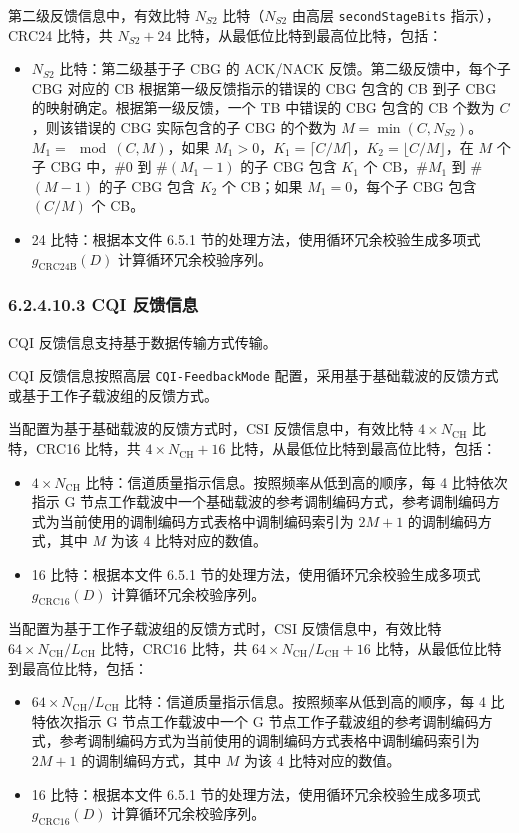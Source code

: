 \documentclass[11pt,a4paper]{ctexart}
\begin{document}
第二级反馈信息中，有效比特 $N_{S2}$ 比特（$N_{S2}$ 由高层 \texttt{secondStageBits} 指示），CRC24 比特，共 $N_{S2} + 24$ 比特，从最低位比特到最高位比特，包括：
\begin{itemize}[nosep]
  \item $N_{S2}$ 比特：第二级基于子 CBG 的 ACK/NACK 反馈。第二级反馈中，每个子 CBG 对应的 CB 根据第一级反馈指示的错误的 CBG 包含的 CB 到子 CBG 的映射确定。根据第一级反馈，一个 TB 中错误的 CBG 包含的 CB 个数为 $C$，则该错误的 CBG 实际包含的子 CBG 的个数为 $M = \min(C, N_{S2})$。$M_1 = \mod(C, M)$，如果 $M_1 > 0$，$K_1 = \lceil C/M \rceil$，$K_2 = \lfloor C/M \rfloor$，在 $M$ 个子 CBG 中，\#0 到 \#$(M_1-1)$ 的子 CBG 包含 $K_1$ 个 CB，\#$M_1$ 到 \#$(M-1)$ 的子 CBG 包含 $K_2$ 个 CB；如果 $M_1 = 0$，每个子 CBG 包含 $(C/M)$ 个 CB。
  \item 24 比特：根据本文件 6.5.1 节的处理方法，使用循环冗余校验生成多项式 $g_{\mathrm{CRC24B}}(D)$ 计算循环冗余校验序列。
\end{itemize}

\subsubsection{6.2.4.10.3 CQI 反馈信息}

CQI 反馈信息支持基于数据传输方式传输。

CQI 反馈信息按照高层 \texttt{CQI-FeedbackMode} 配置，采用基于基础载波的反馈方式或基于工作子载波组的反馈方式。

当配置为基于基础载波的反馈方式时，CSI 反馈信息中，有效比特 $4 \times N_{\mathrm{CH}}$ 比特，CRC16 比特，共 $4 \times N_{\mathrm{CH}} + 16$ 比特，从最低位比特到最高位比特，包括：
\begin{itemize}[nosep]
  \item $4 \times N_{\mathrm{CH}}$ 比特：信道质量指示信息。按照频率从低到高的顺序，每 4 比特依次指示 G 节点工作载波中一个基础载波的参考调制编码方式，参考调制编码方式为当前使用的调制编码方式表格中调制编码索引为 $2M+1$ 的调制编码方式，其中 $M$ 为该 4 比特对应的数值。
  \item 16 比特：根据本文件 6.5.1 节的处理方法，使用循环冗余校验生成多项式 $g_{\mathrm{CRC16}}(D)$ 计算循环冗余校验序列。
\end{itemize}

当配置为基于工作子载波组的反馈方式时，CSI 反馈信息中，有效比特 $64 \times N_{\mathrm{CH}}/L_{\mathrm{CH}}$ 比特，CRC16 比特，共 $64 \times N_{\mathrm{CH}}/L_{\mathrm{CH}} + 16$ 比特，从最低位比特到最高位比特，包括：
\begin{itemize}[nosep]
  \item $64 \times N_{\mathrm{CH}}/L_{\mathrm{CH}}$ 比特：信道质量指示信息。按照频率从低到高的顺序，每 4 比特依次指示 G 节点工作载波中一个 G 节点工作子载波组的参考调制编码方式，参考调制编码方式为当前使用的调制编码方式表格中调制编码索引为 $2M+1$ 的调制编码方式，其中 $M$ 为该 4 比特对应的数值。
  \item 16 比特：根据本文件 6.5.1 节的处理方法，使用循环冗余校验生成多项式 $g_{\mathrm{CRC16}}(D)$ 计算循环冗余校验序列。
\end{itemize}
\end{document}
